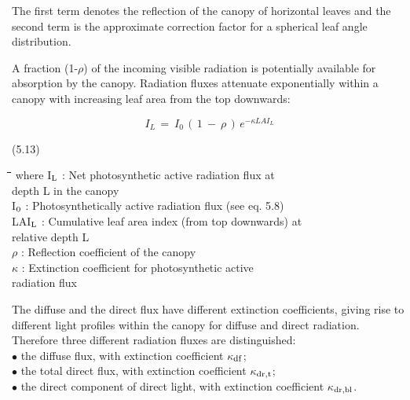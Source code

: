 \documentclass[11pt]{article}
\begin{document}
 \bigskip
The first term denotes the reflection of the canopy of horizontal leaves and the second
term is the approximate correction factor for a spherical leaf angle distribu\-tion.

\bigskip
\bigskip
A fraction (1-$\rho$) of the incoming visible radiation is potentially available for absorp\-tion by
the canopy. Radiation fluxes attenuate exponentially within a canopy with increasing leaf
area from the top downwards:

\begin{displaymath}
I _{L~} =~ I _{0} \, (\, 1~-~\rho \, )\, e ^{- \kappa LAI _{L} }
\end{displaymath}

\bigskip
\strut\hfill (5.13)

\nwln
\begin{tabbing}
\hspace{1.27cm}\=\hspace{1.27cm}\=\hspace{1.27cm}\=\hspace{1.27cm}\=%
\hspace{1.27cm}\=\hspace{1.27cm}\=\hspace{1.27cm}\=\hspace{1.27cm}\=%
\hspace{1.27cm}\=\hspace{1.27cm}\=\kill
where\> I$_{{\rm L}}$\> : Net photosynthetic active radiation flux at \\
\>\>   depth L in the canopy\> \> \> \> \> \> \> \> [J m$^{{\rm -2}}$ s$^{{\rm -1}}$]\\
\>I$_{{\rm 0}}$\> : Photosynthetically active radia\-tion flux (see eq. 5.8)\> \> \> \> \> \> \> \> [J m$^{{\rm -2}}$ s$^{{\rm -1}}$]\\
\>LAI$_{{\rm L}}$\> : Cumulative leaf area index (from top downwards) at \\
\>\>   relative depth L  \> \> \> \> \> \> \> \> [ha ha$^{{\rm -1}}$]\\
\>$\rho$\> : Reflection coefficient of the canopy\> \> \> \> \> \> \> \> [-]\\
\>$\kappa$\> : Extinction coefficient for photosynthetic active \\
\>\>   radiation flux\> \> \> \> \> \> \> \> [-]
\end{tabbing}

\bigskip
\bigskip
The diffuse and the direct flux have different extinction coefficients, giving rise to
different light profiles within the canopy for diffuse and direct radiation. Therefore three
different radiation fluxes are distinguished:\\
$\bullet$ the diffuse flux, with extinction coefficient $\kappa$$_{{\rm df}}$;\\
$\bullet$ the total direct flux, with extinction coefficient $\kappa$$_{{\rm dr,t}}$;\\
$\bullet$ the direct component of direct light, with extinction coefficient $\kappa$$_{{\rm dr,bl}}$.
\end{document}

